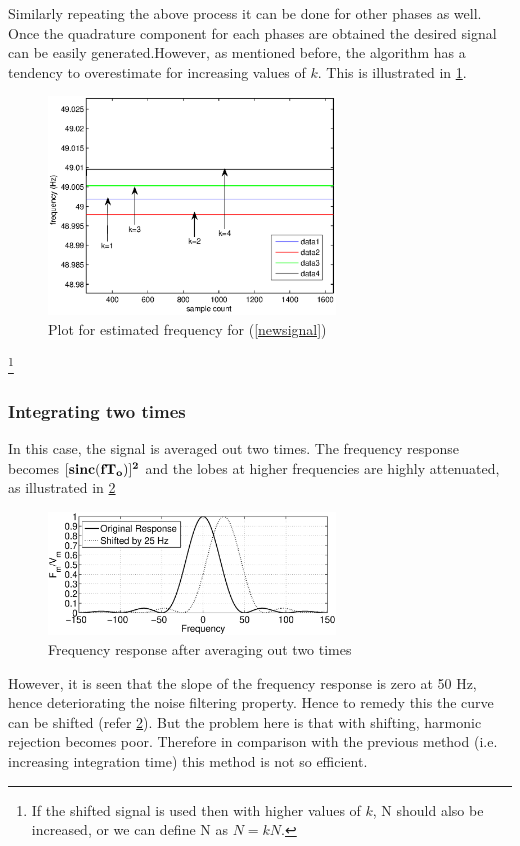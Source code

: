 Similarly repeating the above process it can be done for other phases as well. Once the quadrature component for each phases are obtained the desired signal can be easily generated.However, as mentioned before, the algorithm has a tendency to overestimate for increasing values of $k$. This is illustrated in \figurename\ref{vark2}.
\begin{figure}[!t]
\centering
\includegraphics[width=3.0in]{overunderestimateshifted}
\caption{Plot for estimated frequency for (\ref{newsignal})}
\label{vark2}
\end{figure}
\footnote{If the shifted signal is used then with higher values of $k$, N should also be increased, or we can define N as $N=kN$.}
\subsubsection{Integrating two times}
In this case, the signal is averaged out two times. The frequency response becomes ${\bf [sinc(fT_o)]^2}$ and the lobes at higher frequencies are highly attenuated, as illustrated in \figurename\ref{squareshift}
\begin{figure}[!t]
\centering
\includegraphics[width=3.0in]{squareshift}
\caption{Frequency response after averaging out two times}
\label{squareshift}
\end{figure}
However, it is seen that the slope of the frequency response is zero at 50 Hz, hence deteriorating the noise filtering property. Hence to remedy this the curve can be shifted (refer \figurename\ref{squareshift}). But the problem here is that with shifting, harmonic rejection becomes poor. Therefore in comparison with the previous method (i.e. increasing integration time) this method is not so efficient.

